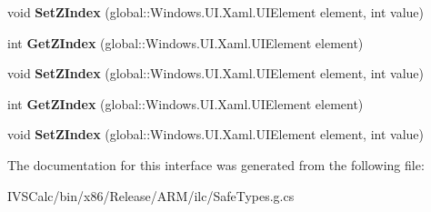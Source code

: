\begin{DoxyCompactItemize}
\item 
\mbox{\label{interface_windows_1_1_u_i_1_1_xaml_1_1_controls_1_1_i_canvas_statics_a08d5b549b32b6a15542fa05c96024eaa}} 
void {\bfseries Set\+Z\+Index} (global\+::\+Windows.\+U\+I.\+Xaml.\+U\+I\+Element element, int value)
\item 
\mbox{\label{interface_windows_1_1_u_i_1_1_xaml_1_1_controls_1_1_i_canvas_statics_a324efd7938fc847fe5b7b78932006c57}} 
int {\bfseries Get\+Z\+Index} (global\+::\+Windows.\+U\+I.\+Xaml.\+U\+I\+Element element)
\item 
\mbox{\label{interface_windows_1_1_u_i_1_1_xaml_1_1_controls_1_1_i_canvas_statics_a08d5b549b32b6a15542fa05c96024eaa}} 
void {\bfseries Set\+Z\+Index} (global\+::\+Windows.\+U\+I.\+Xaml.\+U\+I\+Element element, int value)
\item 
\mbox{\label{interface_windows_1_1_u_i_1_1_xaml_1_1_controls_1_1_i_canvas_statics_a324efd7938fc847fe5b7b78932006c57}} 
int {\bfseries Get\+Z\+Index} (global\+::\+Windows.\+U\+I.\+Xaml.\+U\+I\+Element element)
\item 
\mbox{\label{interface_windows_1_1_u_i_1_1_xaml_1_1_controls_1_1_i_canvas_statics_a08d5b549b32b6a15542fa05c96024eaa}} 
void {\bfseries Set\+Z\+Index} (global\+::\+Windows.\+U\+I.\+Xaml.\+U\+I\+Element element, int value)
\end{DoxyCompactItemize}


The documentation for this interface was generated from the following file\+:\begin{DoxyCompactItemize}
\item 
I\+V\+S\+Calc/bin/x86/\+Release/\+A\+R\+M/ilc/Safe\+Types.\+g.\+cs\end{DoxyCompactItemize}
